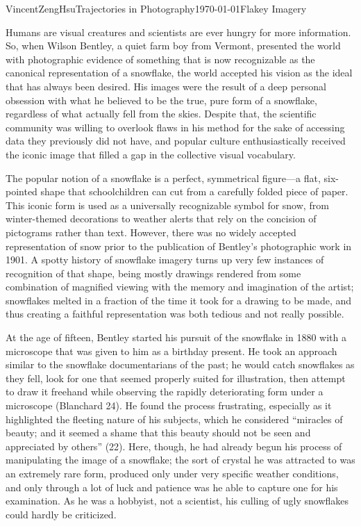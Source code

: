 \documentclass{article}[12pt]
\begin{document}
\begin{mla}{Vincent}{Zeng}{Hsu}{Trajectories in Photography}{\today}{Flakey Imagery}

Humans are visual creatures and scientists are ever hungry for more information. So, when Wilson Bentley, a quiet farm boy from Vermont, presented the world with photographic evidence of something that is now recognizable as the canonical representation of a snowflake, the world accepted his vision as the ideal that has always been desired. His images were the result of a deep personal obsession with what he believed to be the true, pure form of a snowflake, regardless of what actually fell from the skies. Despite that, the scientific community was willing to overlook flaws in his method for the sake of accessing data they previously did not have, and popular culture enthusiastically received the iconic image that filled a gap in the collective visual vocabulary.

The popular notion of a snowflake is a perfect, symmetrical figure---a flat, six-pointed shape that schoolchildren can cut from a carefully folded piece of paper. This iconic form is used as a universally recognizable symbol for snow, from winter-themed decorations to weather alerts that rely on the concision of pictograms rather than text. However, there was no widely accepted representation of snow prior to the publication of Bentley's photographic work in 1901. A spotty history of snowflake imagery turns up very few instances of recognition of that shape, being mostly drawings rendered from some combination of magnified viewing with the memory and imagination of the artist; snowflakes melted in a fraction of the time it took for a drawing to be made, and thus creating a faithful representation was both tedious and not really possible. 

At the age of fifteen, Bentley started his pursuit of the snowflake in 1880 with a microscope that was given to him as a birthday present. He took an approach similar to the snowflake documentarians of the past; he would catch snowflakes as they fell, look for one that seemed properly suited for illustration, then attempt to draw it freehand while observing the rapidly deteriorating form under a microscope (Blanchard 24). He found the process frustrating, especially as it highlighted the fleeting nature of his subjects, which he considered ``miracles of beauty; and it seemed a shame that this beauty should not be seen and appreciated by others'' (22). Here, though, he had already begun his process of manipulating the image of a snowflake; the sort of crystal he was attracted to was an extremely rare form, produced only under very specific weather conditions, and only through a lot of luck and patience was he able to capture one for his examination. As he was a hobbyist, not a scientist, his culling of ugly snowflakes could hardly be criticized. 


\end{mla}
\end{document}
